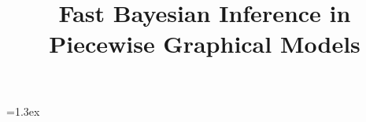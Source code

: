 \usepackage{algorithmic} %
\usepackage[vlined,algoruled,titlenumbered,noend]{algorithm2e}

\usepackage{verbatim} %

\newcommand{\denselist}{\itemsep 0pt\partopsep 0pt}

\newtheorem{theorem}{Theorem}
\newtheorem{proposition}{Proposition}
\newtheorem{example}{Example}
\def\fexample#1#2#3{\vspace{-1ex}\begin{example}[#2]\label{#1}\rm #3
\hspace*{\fill} $\diamondsuit\quad$ \end{example}\vspace{-2ex} }
\newcommand{\tuple}[1] {\langle #1 \rangle}
\newcommand{\bvec}[1]{\textbf{#1}}
\newcommand{\indicator}{\mathbb{I}}%

\def\eqvsp{}  \newdimen\paravsp  \paravsp=1.3ex
\def\paradot#1{\vspace{\paravsp plus 0.5\paravsp minus 0.5\paravsp}\noindent{\bf\boldmath{#1.}}}

\def\lgap{3.2mm}%
\newcommand{\svdots}{\vspace{-\lgap}.\vspace{-\lgap}\\.\vspace{-\lgap}\\.} %

\title{
Fast Bayesian Inference in\\ Piecewise Graphical Models
}


